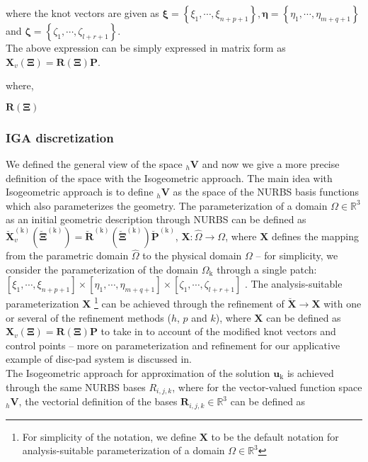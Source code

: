 where the knot vectors are given as $\bm \xi = \left\{ {{\xi _1}, \cdots ,{\xi _{n + p + 1}}} \right\}, \bm \eta = \left\{ {{\eta _1}, \cdots ,{\eta _{m + q    + 1}}} \right\}$ and $\bm \zeta = \left\{ {{\zeta _1}, \cdots ,{\zeta _{l + r + 1}}} \right\}$. \\

The above expression can be simply expressed in matrix form as $\bm X_v(\mathbf{\Xi}) = \mathbf{R(\Xi) \mathbf{P}}$. 

where,

$\mathbf{R(\Xi)}$

\subsubsection{IGA discretization}\label{IGA_contandfric}

We defined the general view of the space ${}_h \bm V$ and now we give a more precise definition of the space with the Isogeometric approach. The main idea with Isogeometric approach is to define ${}_h \bm V$ as the space of the NURBS basis functions which also parameterizes the geometry. 
The parameterization of a domain $\Omega \in \mathbb{R}^3$ as an initial geometric description through NURBS can be defined as $\breve{\bm {X}}^\mathrm{(k)}_v(\breve{\mathbf{\Xi}}^\mathrm{(k)}) = \breve{{\mathbf{R}}}^\mathrm{(k)} (\breve{\mathbf{\Xi}}^\mathrm{(k)}) \breve{\mathbf{P}}^\mathrm{(k)}$, $\bm X : \hat{\Omega}\rightarrow\Omega$, where $\bm {X}$ defines the mapping from the parametric domain $\hat{\Omega}$ to the physical domain $\Omega$ -- for simplicity, we consider the parameterization of the domain $\Omega_\mathrm{k}$  through a single patch: $[ {\xi _1}, \cdots ,{\xi _{n + p + 1}} ] \times  [ {{\eta _1}, \cdots ,{\eta _{m + q    + 1}}} ] \times [ {\zeta _1}, \cdots ,{\zeta _{l + r + 1}} ]$ . 
The analysis-suitable parameterization $\bm X$ \footnote{For simplicity of the notation, we define $\bm{X}$ to be the default notation for analysis-suitable parameterization of a domain $\Omega \in \mathbb{R}^3$} can be achieved through the refinement of $\breve{\bm{X}} \rightarrow \bm{X}$ with one or several of the refinement methods ($h$, $p$ and $k$), where $\bm X$ can be defined as ${\bm {X}}_v({\mathbf{\Xi}}) = {\mathbf{{R}}}(\mathbf{\Xi}) \mathbf{{P}}$ to take in to account of the modified knot vectors and control points -- more on parameterization and refinement for our applicative example of disc-pad system is discussed in.\\

The Isogeometric approach for approximation of the solution $\bm{u}_\mathrm{k}$ is achieved through the same NURBS bases $R_{i,j,k}$, where for the vector-valued function space ${}_h\bm V$, the vectorial definition of the bases  $\bm R_{i,j,k} \in \mathbb{R}^3$ can be defined as\\

